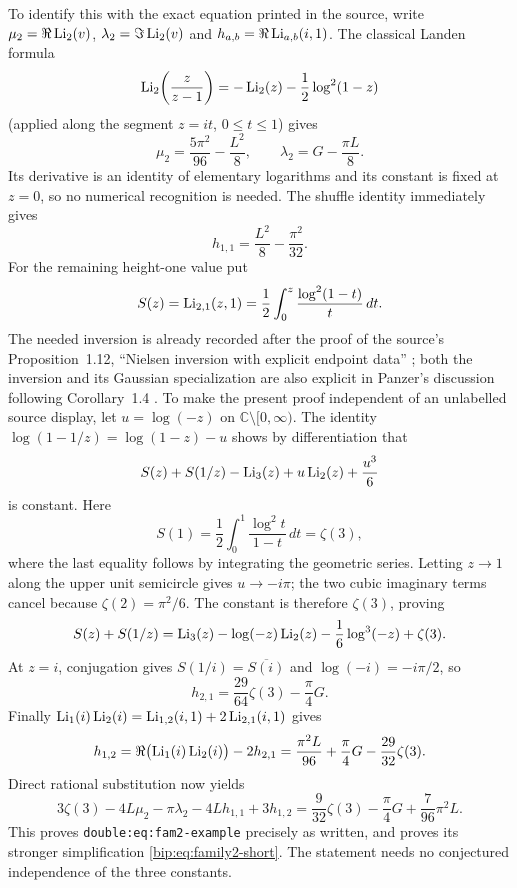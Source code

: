 To identify this with the exact equation printed in the source, write
$\mu_2=\Re\operatorname{Li}_2(v)$, $\lambda_2=\Im\operatorname{Li}_2(v)$ and
$h_{a,b}=\Re\operatorname{Li}_{a,b}(i,1)$. The classical Landen formula
\[
 \operatorname{Li}_2\!\left(\frac z{z-1}\right)
      =-\operatorname{Li}_2(z)-\frac12\log^2(1-z)
\]
(applied along the segment $z=it$, $0\le t\le1$) gives
\[
 \mu_2=\frac{5\pi^2}{96}-\frac{L^2}{8},\qquad
 \lambda_2=G-\frac{\pi L}{8}.
\]
Its derivative is an identity of elementary logarithms and its
constant is fixed at $z=0$, so no numerical recognition is needed.
The shuffle identity immediately gives
\[
 h_{1,1}=\frac{L^2}{8}-\frac{\pi^2}{32}.
\]
For the remaining height-one value put
\[
 S(z)=\operatorname{Li}_{2,1}(z,1)=\frac12\int_0^z\frac{\log^2(1-t)}t\,dt.
\]
The needed inversion is already recorded after the proof of the source's
Proposition~1.12, ``Nielsen inversion with explicit endpoint data''
\cite{SourceManuscript}; both the inversion and its Gaussian specialization
are also explicit in Panzer's discussion following Corollary~1.4
\cite{bip:Panzer2017}.  To make the present proof independent of an
unlabelled source display, let $u=\log(-z)$ on
$\mathbb C\setminus[0,\infty)$.  The identity
$\log(1-1/z)=\log(1-z)-u$ shows by differentiation that
\[
 S(z)+S(1/z)-\operatorname{Li}_3(z)+u\operatorname{Li}_2(z)+\frac{u^3}{6}
\]
is constant.  Here
\[
 S(1)=\frac12\int_0^1\frac{\log^2t}{1-t}\,dt=\zeta(3),
\]
where the last equality follows by integrating the geometric series.
Letting $z\to1$ along the upper unit semicircle gives $u\to-i\pi$;
the two cubic imaginary terms cancel because $\zeta(2)=\pi^2/6$.
The constant is therefore $\zeta(3)$, proving
\begin{equation}\label{bip:eq:nielsen-inversion}
 S(z)+S(1/z)=\operatorname{Li}_3(z)-\log(-z)\operatorname{Li}_2(z)
               -\frac16\log^3(-z)+\zeta(3).
\end{equation}
At $z=i$, conjugation gives $S(1/i)=\overline{S(i)}$ and
$\log(-i)=-i\pi/2$, so
\[
 h_{2,1}=\frac{29}{64}\zeta(3)-\frac\pi4G.
\]
Finally $\operatorname{Li}_1(i)\operatorname{Li}_2(i)=\operatorname{Li}_{1,2}(i,1)+2\operatorname{Li}_{2,1}(i,1)$
gives
\[
 h_{1,2}=\Re\bigl(\operatorname{Li}_1(i)\operatorname{Li}_2(i)\bigr)-2h_{2,1}
       =\frac{\pi^2L}{96}+\frac\pi4G-\frac{29}{32}\zeta(3).
\]
Direct rational substitution now yields
\[
 3\zeta(3)-4L\mu_2-\pi\lambda_2-4Lh_{1,1}+3h_{1,2}
 =\frac9{32}\zeta(3)-\frac\pi4G+\frac7{96}\pi^2L.
\]
This proves \texttt{double:eq:fam2-example} precisely as written,
and proves its stronger simplification \eqref{bip:eq:family2-short}.
The statement needs no conjectured independence of the three constants.

